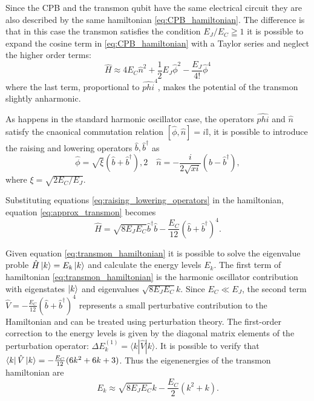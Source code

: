 Since the CPB and the transmon qubit have the same electrical circuit they are also described by the same hamiltonian \ref{eq:CPB_hamiltonian}. 
The difference is that in this case the transmon satisfies the condition $E_J/E_C \geqq 1$ it is possible to expand the cosine term in \ref{eq:CPB_hamiltonian} with a Taylor series and neglect the higher order terms:
\begin{equation}\label{eq:approx_transmon}
    \hat{H}\approx 4E_C\hat{n}^2 + \frac{1}{2}E_J\hat{\phi}^2 - \frac{E_J}{4!}\hat{\phi}^4
\end{equation}
where the last term, proportional to $\hat{phi}^4$, makes the potential of the transmon slightly anharmonic.

As happens in the standard harmonic oscillator case, the operators $\hat{phi}$ and $\hat{n}$ satisfy the cnaonical commutation relation $[\hat{\phi},\hat{n}]=i\mathbb{I}$, it is possible to introduce the raising and lowering operators $\hat{b},\hat{b}^\dagger$ as
\begin{equation}\label{eq:raising_lowering_operators}
    \hat{\phi} = \sqrt{\xi}(\hat{b}+\hat{b}^\dagger), 2\quad \hat{n} = -\frac{i}{2\sqrt{xi}}(\hat{b}-\hat{b}^\dagger),
\end{equation}
where $\xi =  \sqrt{2E_C/E_J}$.

Substituting equations \ref{eq:raising_lowering_operators} in the hamiltonian, equation \ref{eq:approx_transmon} becomes
\begin{equation}\label{eq:transmon_hamiltonian}
    \hat{H} = \sqrt{8E_JE_C}\hat{b}^\dagger\hat{b} - \frac{E_C}{12}(\hat{b}+\hat{b}^\dagger)^4.
\end{equation}

Given equation \ref{eq:transmon_hamiltonian} it is possible to solve the eigenvalue proble $\hat{H}\ket{k}=E_k\ket{k}$ and calculate the energy levels $E_k$.
The first term of hamiltonian \ref{eq:transmon_hamiltonian} is the harmonic oscillator contribution with eigenstates $\ket{k}$ and eigenvalues $\sqrt{8E_JE_C}k$. 
Since $E_C \ll E_J$, the second term $ \hat{V} = -\frac{E_C}{12}(\hat{b} + \hat{b}^\dagger)^4$ represents a small perturbative contribution to the Hamiltonian and can be treated using perturbation theory. 
The first-order correction to the energy levels is given by the diagonal matrix elements of the perturbation operator: $\Delta E_k^{(1)} = \langle k | \hat{V} | k \rangle$.
It is possible to verify that $\bra{k} \hat{V} \ket{k} = -\frac{E_C}{12} (6k^2 + 6k + 3)$. 
Thus the eigenenergies of the transmon hamiltonian are 
\begin{equation}
    E_k \approx \sqrt{8E_JE_C}k - \frac{E_C}{2}(k^2 + k).
\end{equation}

